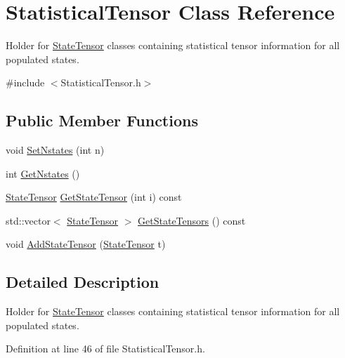 \hypertarget{classStatisticalTensor}{\section{Statistical\-Tensor Class Reference}
\label{classStatisticalTensor}
}


Holder for \hyperlink{classStateTensor}{State\-Tensor} classes containing statistical tensor information for all populated states.  




{\ttfamily \#include $<$Statistical\-Tensor.\-h$>$}

\subsection*{Public Member Functions}
\begin{DoxyCompactItemize}
\item 
void \hyperlink{classStatisticalTensor_a29b7d869efd527ea27ffc8aa9c30e7d5}{Set\-Nstates} (int n)
\item 
int \hyperlink{classStatisticalTensor_acfe377cf206cd2398b4b2906577d96c1}{Get\-Nstates} ()
\item 
\hyperlink{classStateTensor}{State\-Tensor} \hyperlink{classStatisticalTensor_a325e421b33247036151220df1dd688ad}{Get\-State\-Tensor} (int i) const 
\item 
std\-::vector$<$ \hyperlink{classStateTensor}{State\-Tensor} $>$ \hyperlink{classStatisticalTensor_abddf74499feeb18eb458d7e6f7c5c846}{Get\-State\-Tensors} () const 
\item 
void \hyperlink{classStatisticalTensor_a9c6b630b2b5ef343d175393d10b3d020}{Add\-State\-Tensor} (\hyperlink{classStateTensor}{State\-Tensor} t)
\end{DoxyCompactItemize}


\subsection{Detailed Description}
Holder for \hyperlink{classStateTensor}{State\-Tensor} classes containing statistical tensor information for all populated states. 

Definition at line 46 of file Statistical\-Tensor.\-h.



